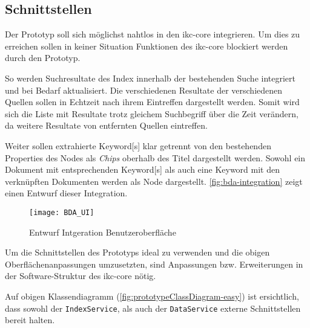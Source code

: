 \subsection{Schnittstellen}
Der Prototyp soll sich möglichst nahtlos in den \gls{ikc-core} integrieren. Um dies zu erreichen sollen in keiner Situation Funktionen des \gls{ikc-core} blockiert werden durch den Prototyp. 

So werden Suchresultate des Index innerhalb der bestehenden Suche integriert und bei Bedarf aktualisiert. Die verschiedenen Resultate der verschiedenen Quellen sollen in Echtzeit nach ihrem Eintreffen dargestellt werden. Somit wird sich die Liste mit Resultate trotz gleichem Suchbegriff über die Zeit verändern, da weitere Resultate von entfernten Quellen eintreffen. 

Weiter sollen extrahierte \gls{Keyword}[s] klar getrennt von den bestehenden Properties des Nodes als \textit{Chips} oberhalb des Titel dargestellt werden. Sowohl ein Dokument mit entsprechenden \gls{Keyword}[s] als auch eine \gls{Keyword} mit den verknüpften Dokumenten werden als Node dargestellt. \autoref{fig:bda-integration} zeigt einen Entwurf dieser Integration. 

    \begin{figure}[H]
    \centering
    \texttt{[image: BDA\_UI]}
    \caption{Entwurf Intgeration Benutzeroberfläche}
    \label{fig:bda-integration}
    \end{figure}

Um die Schnittstellen des Prototyps ideal zu verwenden und die obigen Oberflächenanpassungen umzusetzten, sind Anpassungen bzw. Erweiterungen in der Software-Struktur des \gls{ikc-core} nötig. 

Auf obigen Klassendiagramm (\autoref{fig:prototypeClassDiagram-easy}) ist ersichtlich, dass sowohl der \texttt{IndexService}, als auch der \texttt{DataService} externe Schnittstellen bereit halten.


